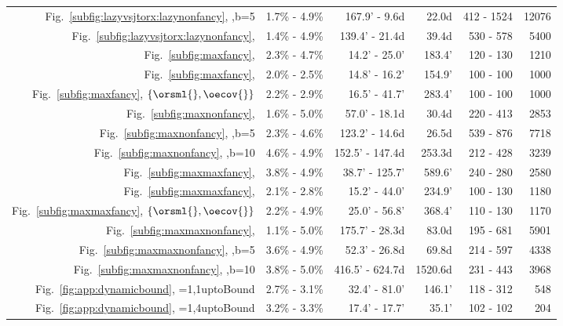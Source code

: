 \begin{tabular}{|r|r|r|r|r|r|}
\rowcolor{blue!10}
Fig.~\ref{subfig:lazyvsjtorx:lazynonfancy}, \onfrsml{},b=5 &  1.7\% - 4.9\% &  167.9' - 9.6d &  22.0d &  412 - 1524 &  12076 \\
Fig.~\ref{subfig:lazyvsjtorx:lazynonfancy}, \oesisol{} &  1.4\% - 4.9\% &  139.4' - 21.4d &  39.4d &  530 - 578 &  5400 \\
\rowcolor{blue!10}
Fig.~\ref{subfig:maxfancy}, \orsml{} &  2.3\% - 4.7\% &  14.2' - 25.0' &  183.4' &  120 - 130 &  1210 \\
Fig.~\ref{subfig:maxfancy}, \oecov{} &  2.0\% - 2.5\% &  14.8' - 16.2' &  154.9' &  100 - 100 &  1000 \\
\rowcolor{blue!10}
Fig.~\ref{subfig:maxfancy}, $\{\orsml{},\oecov{}\}$ &  2.2\% - 2.9\% &  16.5' - 41.7' &  283.4' &  100 - 100 &  1000 \\
Fig.~\ref{subfig:maxnonfancy}, \oesisol{} &  1.6\% - 5.0\% &  57.0' - 18.1d &  30.4d &  220 - 413 &  2853 \\
\rowcolor{blue!10}
Fig.~\ref{subfig:maxnonfancy}, \onfrsml{},b=5 &  2.3\% - 4.6\% &  123.2' - 14.6d &  26.5d &  539 - 876 &  7718 \\
Fig.~\ref{subfig:maxnonfancy}, \onfrsml{},b=10 &  4.6\% - 4.9\% &  152.5' - 147.4d &  253.3d &  212 - 428 &  3239 \\
\rowcolor{blue!10}
Fig.~\ref{subfig:maxmaxfancy}, \orsml{} &  3.8\% - 4.9\% &  38.7' - 125.7' &  589.6' &  240 - 280 &  2580 \\
Fig.~\ref{subfig:maxmaxfancy}, \oecov{} &  2.1\% - 2.8\% &  15.2' - 44.0' &  234.9' &  100 - 130 &  1180 \\
\rowcolor{blue!10}
Fig.~\ref{subfig:maxmaxfancy}, $\{\orsml{},\oecov{}\}$ &  2.2\% - 4.9\% &  25.0' - 56.8' &  368.4' &  110 - 130 &  1170 \\
Fig.~\ref{subfig:maxmaxnonfancy}, \oesisol{} &  1.1\% - 5.0\% &  175.7' - 28.3d &  83.0d &  195 - 681 &  5901 \\
\rowcolor{blue!10}
Fig.~\ref{subfig:maxmaxnonfancy}, \onfrsml{},b=5 &  3.6\% - 4.9\% &  52.3' - 26.8d &  69.8d &  214 - 597 &  4338 \\
Fig.~\ref{subfig:maxmaxnonfancy}, \onfrsml{},b=10 &  3.8\% - 5.0\% &  416.5' - 624.7d &  1520.6d &  231 - 443 &  3968 \\
\rowcolor{blue!10}
Fig.~\ref{fig:app:dynamicbound}, \maxprt{}=1,1uptoBound &  2.7\% - 3.1\% &  32.4' - 81.0' &  146.1' &  118 - 312 &  548 \\
Fig.~\ref{fig:app:dynamicbound}, \maxprt{}=1,4uptoBound &  3.2\% - 3.3\% &  17.4' - 17.7' &  35.1' &  102 - 102 &  204 \\

\end{tabular}
